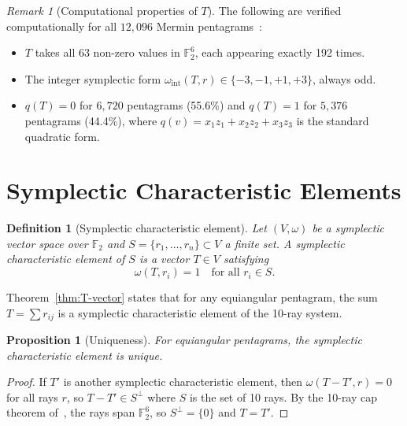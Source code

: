 \documentclass[11pt,a4paper]{article}
\newtheorem{proposition}[theorem]{Proposition}
\newtheorem{definition}[theorem]{Definition}
\theoremstyle{remark}
\newtheorem{remark}[theorem]{Remark}
\newcommand{\F}{\mathbb{F}}
\begin{document}
\begin{remark}[Computational properties of $T$]
\label{rem:T-stats}
The following are verified computationally for all $12{,}096$ Mermin
pentagrams~\cite{PaperXIIsuppl}:
\begin{itemize}
  \item $T$ takes all 63 non-zero values in $\F_2^6$, each appearing
    exactly 192 times.
  \item The integer symplectic form $\omega_{\text{int}}(T, r) \in
    \{-3, -1, +1, +3\}$, always odd.
  \item $q(T) = 0$ for $6{,}720$ pentagrams (55.6\%) and $q(T) = 1$
    for $5{,}376$ pentagrams (44.4\%), where $q(v) = x_1 z_1 + x_2 z_2
    + x_3 z_3$ is the standard quadratic form.
\end{itemize}
\end{remark}

\section{Symplectic Characteristic Elements}
\label{sec:symplectic-char}

\begin{definition}[Symplectic characteristic element]
\label{def:symplectic-char}
Let $(V, \omega)$ be a symplectic vector space over $\F_2$ and
$S = \{r_1, \ldots, r_n\} \subset V$ a finite set. A
\emph{symplectic characteristic element} of $S$ is a vector $T \in V$
satisfying
\[
  \omega(T, r_i) = 1 \quad \text{for all } r_i \in S.
\]
\end{definition}

Theorem~\ref{thm:T-vector} states that for any equiangular pentagram,
the sum $T = \sum r_{ij}$ is a symplectic characteristic element of the
10-ray system.

\begin{proposition}[Uniqueness]
\label{prop:uniqueness}
For equiangular pentagrams, the symplectic characteristic element is
unique.
\end{proposition}

\begin{proof}
If $T'$ is another symplectic characteristic element, then
$\omega(T - T', r) = 0$ for all rays $r$, so $T - T' \in S^\perp$
where $S$ is the set of 10 rays. By the 10-ray cap theorem
of~\cite{PaperX}, the rays span $\F_2^6$, so $S^\perp = \{0\}$ and
$T = T'$.
\end{proof}
\end{document}
